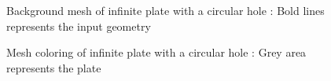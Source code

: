 \begin{figure}
    \centering
    \caption[Background mesh of infinite plate with a circular hole]{Background mesh of infinite plate with a circular hole : Bold lines represents the input geometry}
    \label{qdt_fig:ex_chole_background_mesh}
\end{figure}

\begin{figure}
    \centering
    \caption[Mesh coloring of infinite plate with a circular hole]{Mesh coloring of infinite plate with a circular hole : Grey area represents the plate}
    \label{qdt_fig:ex_chole_mesh_coloring}
\end{figure}

